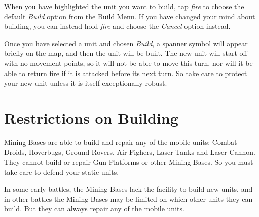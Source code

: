 When you have highlighted the unit you want to build, tap {\it fire} to choose the default {\it Build} option from the Build Menu. If you have changed your mind about building, you can instead hold {\it fire} and choose the {\it Cancel} option instead.

Once you have selected a unit and chosen {\it Build}, a spanner symbol will appear briefly on the map, and then the unit will be built. The new unit will start off with no movement points, so it will not be able to move this turn, nor will it be able to return fire if it is attacked before its next turn. So take care to protect your new unit unless it is itself exceptionally robust.

\section{Restrictions on Building}

\noindent
Mining Bases are able to build and repair any of the mobile units: Combat Droids, Hoverbugs, Ground Rovers, Air Fighers, Laser Tanks and Laser Cannon. They cannot build or repair  Gun Platforms or other Mining Bases. So you must take care to defend your static units.

In some early battles, the Mining Bases lack the facility to build new units, and in other battles the Mining Bases may be limited on which other units they can build. But they can always repair any of the mobile units.
